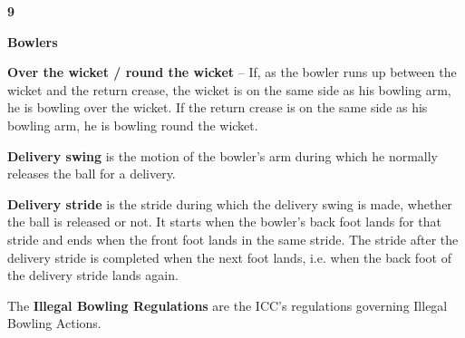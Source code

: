 \documentclass[12pt]{article}
\begin{document}
\vspace{\baselineskip}
{\fontsize{16pt}{19.2pt}\selectfont \textbf{9 \tabto{0.29in} }{\fontsize{15pt}{18.0pt}\selectfont \textbf{Bowlers}\par}\par}\par


\vspace{\baselineskip}
\begin{adjustwidth}{0.4in}{0.04in}
{\fontsize{9pt}{10.8pt} \tabto{0.39in} \textbf{Over the wicket / round the wicket }–\textbf{ }If, as the bowler runs up between the wicket and the return crease, the\textbf{ }wicket is on the same side as his bowling arm, he is bowling over the wicket. If the return crease is on the same side as his bowling arm, he is bowling round the wicket.\par}\par

\end{adjustwidth}


\vspace{\baselineskip}
{\fontsize{9pt}{10.8pt} \tabto{0.39in} {\fontsize{8pt}{9.6pt}\selectfont \textbf{Delivery swing }is the motion of the\textbf{ }bowler’s arm during which he\textbf{ }normally releases the ball for a delivery.\par}\par}\par


\vspace{\baselineskip}
\begin{adjustwidth}{0.4in}{0.11in}
{\fontsize{9pt}{10.8pt} \tabto{0.39in} \textbf{Delivery stride }is the stride during which the delivery swing is made, whether the ball is released or not. It\textbf{ }starts when the bowler’s back foot lands for that stride and ends when the front foot lands in the same stride. The stride after the delivery stride is completed when the next foot lands, i.e. when the back foot of the delivery stride lands again.\par}\par

\end{adjustwidth}


\vspace{\baselineskip}
{\fontsize{9pt}{10.8pt} \tabto{0.39in} {\fontsize{8pt}{9.6pt}\selectfont The \textbf{Illegal Bowling Regulations} are the ICC’s regulations governing Illegal Bowling Actions.\par}\par}\par
\end{document}
